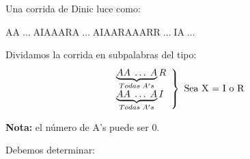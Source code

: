 \documentclass[12pt,a4paper]{report}
\begin{document}
			\par Una corrida de Dinic luce como:
			\begin{center}
				AA$\; \dotsc \;$AIAAARA$\; \dotsc \;$AIAARAAARR$\; \dotsc \;$IA$\; \dotsc \;$
			\end{center}

			\par Dividamos la corrida en subpalabras del tipo:
			\begin{equation*}
		  	\left.
		  	\begin{array}{l}
		    	\underbrace{AA \; \dotsc \; A}_{Todas \; A's}R \\
		    	\underbrace{AA \; \dotsc \; A}_{Todas \; A's}I
		  	\end{array}
		  	\right\rbrace
		  	\textup{ Sea X = I o R}
			\end{equation*}
			\par \textbf{Nota:} el número de A's puede ser 0.
			\vspace{1.5mm}
			\par Debemos determinar:
\end{document}
